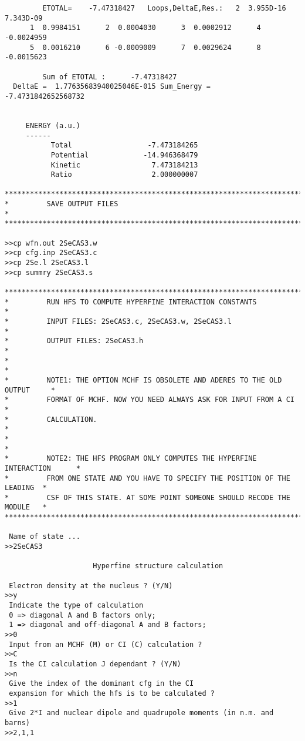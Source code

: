 \documentclass[fleqn,10pt]{book}
\begin{document}
\begin{verbatim}
         ETOTAL=    -7.47318427   Loops,DeltaE,Res.:   2  3.955D-16  7.343D-09
      1  0.9984151      2  0.0004030      3  0.0002912      4 -0.0024959
      5  0.0016210      6 -0.0009009      7  0.0029624      8 -0.0015623

         Sum of ETOTAL :      -7.47318427
  DeltaE =  1.77635683940025046E-015 Sum_Energy =   -7.4731842652568732     


     ENERGY (a.u.)
     ------
           Total                  -7.473184265
           Potential             -14.946368479
           Kinetic                 7.473184213
           Ratio                   2.000000007

*******************************************************************************
*         SAVE OUTPUT FILES                                                   * 
*******************************************************************************

>>cp wfn.out 2SeCAS3.w
>>cp cfg.inp 2SeCAS3.c
>>cp 2Se.l 2SeCAS3.l
>>cp summry 2SeCAS3.s

*******************************************************************************
*         RUN HFS TO COMPUTE HYPERFINE INTERACTION CONSTANTS                  *
*         INPUT FILES: 2SeCAS3.c, 2SeCAS3.w, 2SeCAS3.l                        *
*         OUTPUT FILES: 2SeCAS3.h                                             *  
*                                                                             *
*         NOTE1: THE OPTION MCHF IS OBSOLETE AND ADERES TO THE OLD OUTPUT     *
*         FORMAT OF MCHF. NOW YOU NEED ALWAYS ASK FOR INPUT FROM A CI         *
*         CALCULATION.                                                        *
*                                                                             *
*         NOTE2: THE HFS PROGRAM ONLY COMPUTES THE HYPERFINE INTERACTION      *
*         FROM ONE STATE AND YOU HAVE TO SPECIFY THE POSITION OF THE LEADING  *
*         CSF OF THIS STATE. AT SOME POINT SOMEONE SHOULD RECODE THE MODULE   * 
*******************************************************************************

 Name of state ...
>>2SeCAS3

                     Hyperfine structure calculation

 Electron density at the nucleus ? (Y/N)
>>y
 Indicate the type of calculation
 0 => diagonal A and B factors only;
 1 => diagonal and off-diagonal A and B factors;
>>0
 Input from an MCHF (M) or CI (C) calculation ?
>>C
 Is the CI calculation J dependant ? (Y/N)
>>n
 Give the index of the dominant cfg in the CI
 expansion for which the hfs is to be calculated ?
>>1
 Give 2*I and nuclear dipole and quadrupole moments (in n.m. and barns)
>>2,1,1


\end{verbatim}
\end{document}
